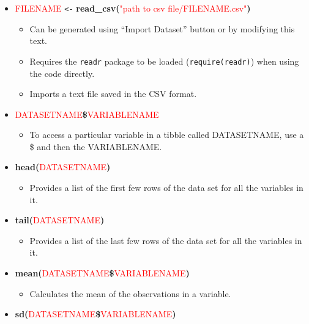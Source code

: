\documentclass[]{book}
\providecommand{\tightlist}{%
  \setlength{\itemsep}{0pt}\setlength{\parskip}{0pt}}
\begin{document}
\begin{itemize}
\item
  \textcolor{red}{FILENAME} \texttt{\textless{}-} \textbf{read\_csv(}\textcolor{red}{"path to csv file/FILENAME.csv"}\textbf{)}

  \begin{itemize}
  \item
    Can be generated using ``Import Dataset'' button or by modifying this text.
  \item
    Requires the \texttt{readr} package to be loaded (\texttt{require(readr)}) when using
    the code directly.
  \item
    Imports a text file saved in the CSV format.
  \end{itemize}
\item
  \textcolor{red}{DATASETNAME}\textbf{\$}\textcolor{red}{VARIABLENAME}

  \begin{itemize}
  \tightlist
  \item
    To access a particular variable in a tibble called DATASETNAME, use
    a \$ and then the VARIABLENAME.
  \end{itemize}
\item
  \textbf{head(}\textcolor{red}{DATASETNAME}\textbf{)}

  \begin{itemize}
  \tightlist
  \item
    Provides a list of the first few rows of the data set for all the
    variables in it. 
  \end{itemize}
\item
  \textbf{tail(}\textcolor{red}{DATASETNAME}\textbf{)}

  \begin{itemize}
  \tightlist
  \item
    Provides a list of the last few rows of the data set for all the
    variables in it. 
  \end{itemize}
\item
  \textbf{mean(}\textcolor{red}{DATASETNAME}\textbf{\$}\textcolor{red}{VARIABLENAME}\textbf{)}

  \begin{itemize}
  \tightlist
  \item
    Calculates the mean of the observations in a variable.
  \end{itemize}
\item
  \textbf{sd(}\textcolor{red}{DATASETNAME}\textbf{\$}\textcolor{red}{VARIABLENAME}\textbf{)}


\end{itemize}
\end{document}
